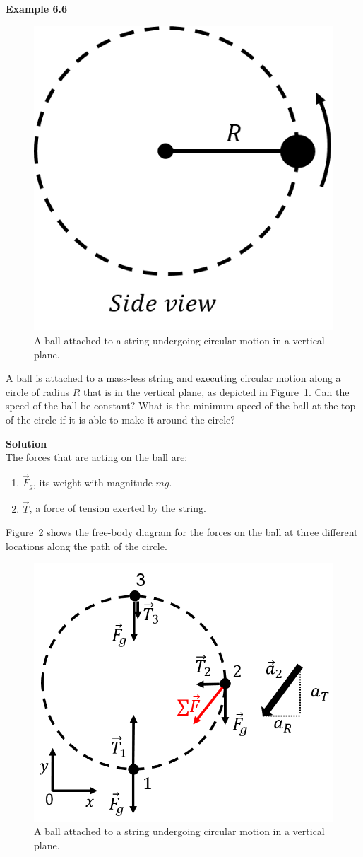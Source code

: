 \begin{framed}
\textbf{Example 6.6}\\
\begin{figure}[!htbp]
\centering
\includegraphics[width=0.27\linewidth]{files/circleV-e337f1c803dda6f492d5f1f0b409191b.png}
\caption[]{A ball attached to a string undergoing circular motion in a vertical plane.}
\label{fig:applyingnewtonslaws:circleV}
\end{figure}

A ball is attached to a mass-less string and executing circular motion along a circle of radius $R$ that is in the vertical plane, as depicted in Figure~\ref{fig:applyingnewtonslaws:circleV}. Can the speed of the ball be constant? What is the minimum speed of the ball at the top of the circle if it is able to make it around the circle?

\begin{framed}
\textbf{Solution}\\
The forces that are acting on the ball are:

\begin{enumerate}
\item $\vec F_g$, its weight with magnitude $mg$.
\item $\vec T$, a force of tension exerted by the string.
\end{enumerate}

Figure~\ref{fig:applyingnewtonslaws:circleV_fbd} shows the free-body diagram for the forces on the ball at three different locations along the path of the circle.

\begin{figure}[!htbp]
\centering
\includegraphics[width=0.4\linewidth]{files/circleV_fbd-ffbc3de10018feef97a6cd6d4f6adba4.png}
\caption[]{A ball attached to a string undergoing circular motion in a vertical plane.}
\label{fig:applyingnewtonslaws:circleV_fbd}
\end{figure}


\end{framed}
\end{framed}
